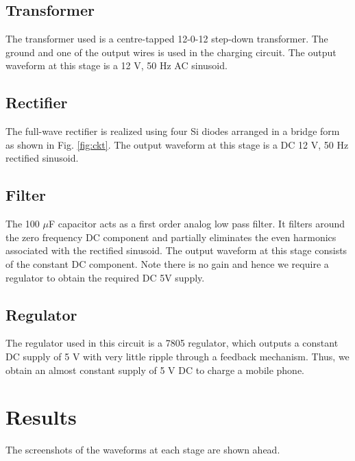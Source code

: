 \documentclass[journal,12pt,twocolumn]{IEEEtran}
\begin{document}
	\subsection{Transformer}
	The transformer used is a centre-tapped 12-0-12 step-down 
	transformer. The ground and one of the output wires is used
	in the charging circuit. The output waveform at this stage is
	a 12 V, 50 Hz AC sinusoid.
	
	\subsection{Rectifier}
	The full-wave rectifier is realized using four Si diodes arranged in a
	bridge form as shown in Fig. \ref{fig:ckt}. The output waveform at this
	stage is a DC 12 V, 50 Hz rectified sinusoid.
	
	\subsection{Filter}
	The 100 $\mu$F capacitor acts as a first order analog low pass filter. It filters
	around the zero frequency DC component and partially eliminates the
	even harmonics associated with the rectified sinusoid. The output 
	waveform at this stage consists of the constant DC component. Note
	there is no gain and hence we require a regulator to obtain the
	required DC 5V supply.
	
	\subsection{Regulator}
	The regulator used in this circuit is a 7805 regulator, which outputs
	a constant DC supply of 5 V with very little ripple through a 
	feedback mechanism. Thus, we obtain an almost
	constant supply of 5 V DC to charge a mobile phone.
	
	\section{Results}
	The screenshots of the waveforms at each stage are shown ahead.
	
\end{document}
